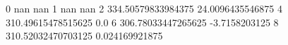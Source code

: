 0 nan nan
1 nan nan
2 334.50579833984375 24.0096435546875
4 310.49615478515625 0.0
6 306.78033447265625 -3.7158203125
8 310.52032470703125 0.024169921875
